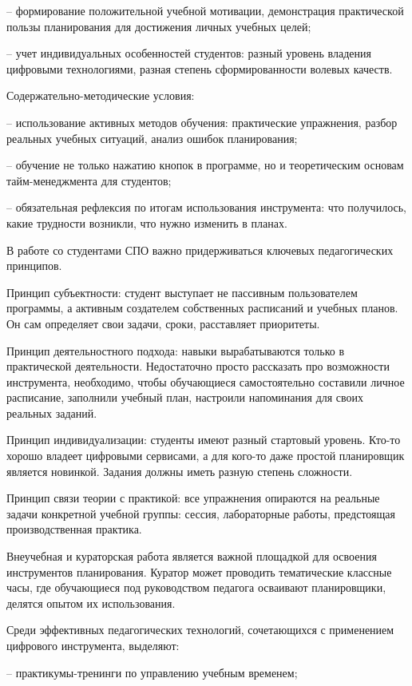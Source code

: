 \documentclass[
]{article}
\begin{document}
-- формирование положительной учебной мотивации, демонстрация
практической пользы планирования для достижения личных учебных целей;

-- учет индивидуальных особенностей студентов: разный уровень владения
цифровыми технологиями, разная степень сформированности волевых качеств.

Содержательно-методические условия:

-- использование активных методов обучения: практические упражнения,
разбор реальных учебных ситуаций, анализ ошибок планирования;

-- обучение не только нажатию кнопок в программе, но и теоретическим
основам тайм-менеджмента для студентов;

-- обязательная рефлексия по итогам использования инструмента: что
получилось, какие трудности возникли, что нужно изменить в планах.

В работе со студентами СПО важно придерживаться ключевых педагогических
принципов.

Принцип субъектности: студент выступает не пассивным пользователем
программы, а активным создателем собственных расписаний и учебных
планов. Он сам определяет свои задачи, сроки, расставляет приоритеты.

Принцип деятельностного подхода: навыки вырабатываются только в
практической деятельности. Недостаточно просто рассказать про
возможности инструмента, необходимо, чтобы обучающиеся самостоятельно
составили личное расписание, заполнили учебный план, настроили
напоминания для своих реальных заданий.

Принцип индивидуализации: студенты имеют разный стартовый уровень.
Кто-то хорошо владеет цифровыми сервисами, а для кого-то даже простой
планировщик является новинкой. Задания должны иметь разную степень
сложности.

Принцип связи теории с практикой: все упражнения опираются на реальные
задачи конкретной учебной группы: сессия, лабораторные работы,
предстоящая производственная практика.

Внеучебная и кураторская работа является важной площадкой для освоения
инструментов планирования. Куратор может проводить тематические классные
часы, где обучающиеся под руководством педагога осваивают планировщики,
делятся опытом их использования.

Среди эффективных педагогических технологий, сочетающихся с применением
цифрового инструмента, выделяют:

-- практикумы-тренинги по управлению учебным временем;
\end{document}
